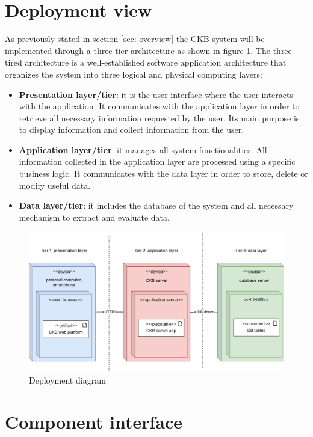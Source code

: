 \section{Deployment view}\label{sec: deployment}
As previously stated in section \ref{sec: overview} the CKB system will be implemented through a three-tier architecture as shown in figure \ref{fig:deployment}. \newline
The three-tired architecture is a well-established software application architecture that organizes the system into three logical and physical computing layers:
\begin{itemize}
    \item \textbf{Presentation layer/tier}: it is the user interface where the user interacts with the application. It communicates with the application layer in order to retrieve all necessary information requested by the user. Its main purpose is to display information and collect information from the user.
    \item \textbf{Application layer/tier}: it manages all system functionalities. All information collected in the application layer are processed using a specific business logic. It communicates with the data layer in order to store, delete or modify useful data.
    \item \textbf{Data layer/tier}: it includes the database of the system and all necessary mechanism to extract and evaluate data.
\end{itemize}
\begin{figure}[h]
    \centering 
    \includegraphics[scale=0.8]{images/deployment.png}
    \caption{Deployment diagram}
    \label{fig:deployment}
\end{figure}
\clearpage

\section{Component interface}
\clearpage

